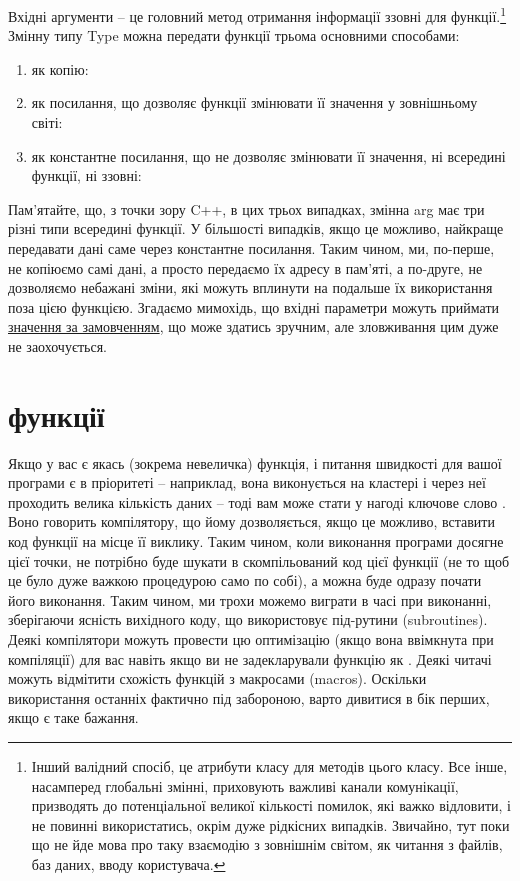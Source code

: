 \documentclass[12pt]{article}
\begin{document}
	Вхідні аргументи -- це головний метод отримання інформації ззовні для функції.\footnote{Інший валідний спосіб, це атрибути класу для методів цього класу. Все інше, насамперед глобальні змінні, приховують важливі канали комунікації, призводять до потенціальної великої кількості помилок, які важко відловити, і не повинні використатись, окрім дуже рідкісних випадків. Звичайно, тут поки що не йде мова про таку взаємодію з зовнішнім світом, як читання з файлів, баз даних, вводу користувача.} Змінну типу Type можна передати функції трьома основними способами:
	\begin{enumerate}
		\item як копію: 
		\item як посилання, що дозволяє функції змінювати її значення у зовнішньому світі: 
		\item як константне посилання, що не дозволяє змінювати її значення, ні всередині функції, ні ззовні: 
	\end{enumerate}
	Пам'ятайте, що, з точки зору C++, в цих трьох випадках, змінна arg має три різні типи всередині функції. У більшості випадків, якщо це можливо, найкраще передавати дані саме через константне посилання. Таким чином, ми, по-перше, не копіюємо самі дані, а просто передаємо їх адресу в пам'яті, а по-друге, не дозволяємо небажані зміни, які можуть вплинути на подальше їх використання поза цією функцією.
	Згадаємо мимохідь, що вхідні параметри можуть приймати \href{https://en.cppreference.com/w/cpp/language/default_arguments}{значення за замовченням}, що може здатись зручним, але зловживання цим дуже не заохочується.

	\section{ функції}
	Якщо у вас є якась (зокрема невеличка) функція, і питання швидкості для вашої програми є в пріоритеті -- наприклад, вона виконується на кластері і через неї проходить велика кількість даних -- тоді вам може стати у нагоді ключове слово \href{https://en.cppreference.com/w/cpp/language/inline}{}. Воно говорить компілятору, що йому дозволяється, якщо це можливо, вставити код функції на місце її виклику. Таким чином, коли виконання програми досягне цієї точки, не потрібно буде шукати в скомпільований код цієї функції (не то щоб це було дуже важкою процедурою само по собі), а можна буде одразу почати його виконання. Таким чином, ми трохи можемо виграти в часі при виконанні, зберігаючи ясність вихідного коду, що використовує під-рутини (subroutines). Деякі компілятори можуть провести цю оптимізацію (якщо вона ввімкнута при компіляції) для вас навіть якщо ви не задекларували функцію як . Деякі читачі можуть відмітити схожість  функцій з макросами (macros). Оскільки використання останніх фактично під забороною, варто дивитися в бік перших, якщо є таке бажання.
	
\end{document}
